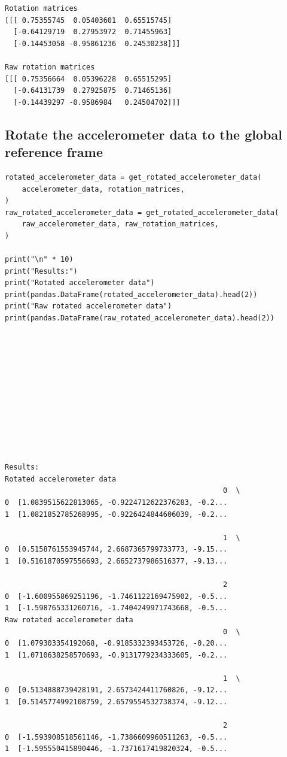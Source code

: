 \documentclass[12pt]{report}
\begin{document}
\label{org3351aa8}
\begin{verbatim}
Rotation matrices
[[[ 0.75355745  0.05403601  0.65515745]
  [-0.64129719  0.27953972  0.71455963]
  [-0.14453058 -0.95861236  0.24530238]]]

Raw rotation matrices
[[[ 0.75356664  0.05396228  0.65515295]
  [-0.64131739  0.27925875  0.71465136]
  [-0.14439297 -0.9586984   0.24504702]]]
\end{verbatim}
\subsection{Rotate the accelerometer data to the global reference frame}
\label{sec:org33e7011}
\begin{verbatim}
rotated_accelerometer_data = get_rotated_accelerometer_data(
    accelerometer_data, rotation_matrices,
)
raw_rotated_accelerometer_data = get_rotated_accelerometer_data(
    raw_accelerometer_data, raw_rotation_matrices,
)

print("\n" * 10)
print("Results:")
print("Rotated accelerometer data")
print(pandas.DataFrame(rotated_accelerometer_data).head(2))
print("Raw rotated accelerometer data")
print(pandas.DataFrame(raw_rotated_accelerometer_data).head(2))
\end{verbatim}

\label{orgff68e5e}
\begin{verbatim}











Results:
Rotated accelerometer data
                                                   0  \
0  [1.0839515622813065, -0.9224712622376283, -0.2...   
1  [1.0821852785268995, -0.9226424844606039, -0.2...   

                                                   1  \
0  [0.5158761553945744, 2.6687365799733773, -9.15...   
1  [0.5161870597556693, 2.6652737986516377, -9.13...   

                                                   2  
0  [-1.600955869251196, -1.7461122169475902, -0.5...  
1  [-1.598765331260716, -1.7404249971743668, -0.5...  
Raw rotated accelerometer data
                                                   0  \
0  [1.079303354192068, -0.9185332393453726, -0.20...   
1  [1.0710638258570693, -0.9131779234333605, -0.2...   

                                                   1  \
0  [0.5134888739428191, 2.6573424411760826, -9.12...   
1  [0.5145774992108759, 2.6579554532738374, -9.12...   

                                                   2  
0  [-1.593908518561146, -1.7386609960511263, -0.5...  
1  [-1.595550415890446, -1.7371617419820324, -0.5...  
\end{verbatim}
\end{document}
